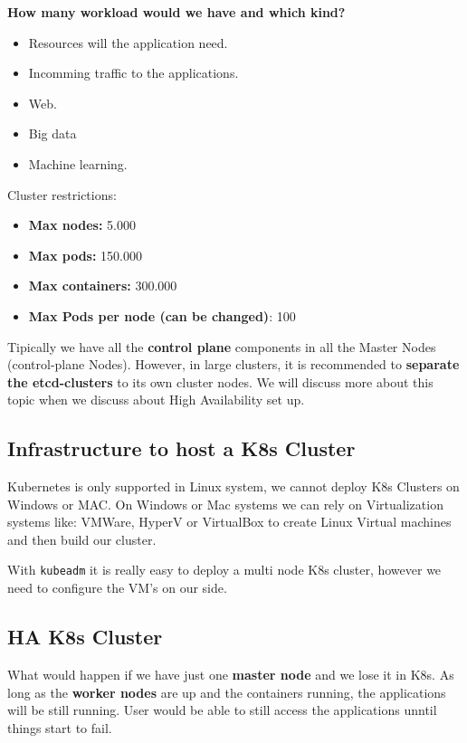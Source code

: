 \documentclass{article}
\newenvironment{blocktemplateI}[1]{%
    \tcolorbox[beamer,%
    noparskip,breakable,
    colframe=Violet,%
    colbacklower=Black,%
    title=#1]}%
    {\endtcolorbox}
\newenvironment{blocktemplateII}[1]{%
    \tcolorbox[beamer,%
    noparskip,breakable,
    colframe=Green,%
    colbacklower=LimeGreen!75!LightGreen,%
    title=#1]}%
    {\endtcolorbox}
\begin{document}
\textbf{How many workload would we have and which kind?}
\begin{itemize}
    \item Resources will the application need.
    \item Incomming traffic to the applications.
    \item Web.
    \item Big data
    \item Machine learning.
\end{itemize}

\begin{blocktemplateII}{NOTE}
Cluster restrictions:
\begin{itemize}
    \item \textbf{Max nodes:} 5.000
    \item \textbf{Max pods:} 150.000
    \item \textbf{Max containers:} 300.000
    \item \textbf{Max Pods per node (can be changed)}: 100
\end{itemize}
\end{blocktemplateII}

\begin{blocktemplateI}{NOTE}
Tipically we have all the \textbf{control plane} components in all the Master Nodes (control-plane Nodes).
However, in large clusters, it is recommended to \textbf{separate the etcd-clusters}
to its own cluster nodes. We will discuss more about this topic when we discuss about High Availability set up.
\end{blocktemplateI}

\subsection{Infrastructure to host a K8s Cluster}
Kubernetes is only supported in Linux system, we cannot deploy K8s Clusters on Windows or MAC.
On Windows or Mac systems we can rely on Virtualization systems like: VMWare, HyperV or VirtualBox to create Linux Virtual machines and then build our cluster.

With \verb|kubeadm| it is really easy to deploy a multi node K8s cluster, however we need to configure the VM's on our side.

\subsection{HA K8s Cluster}
What would happen if we have just one \textbf{master node} and we lose it in K8s. As long as the \textbf{worker nodes} are up and
the containers running, the applications will be still running. User would be able to still access the applications unntil things start to fail. 
\end{document}
